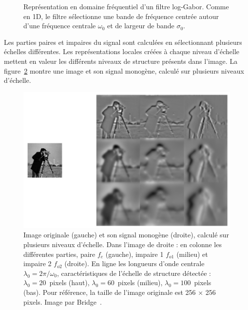 \bigskip

\begin{figure}
    \centering

    \caption[Filtre log-Gabor en 2D]{Représentation en domaine fréquentiel d'un filtre log-Gabor. Comme en 1D, le filtre sélectionne une bande de fréquence centrée autour d'une fréquence centrale $\omega_0$ et de largeur de bande $\sigma_0$.}
    \label{fig:2D-log-gabor}
\end{figure}

Les parties paires et impaires du signal sont calculées en sélectionnant plusieurs échelles différentes. Les représentations locales créées à chaque niveau d'échelle mettent en valeur les différents niveaux de structure présents dans l'image. La figure~\ref{fig:cameraman-monogenic} montre une image et son signal monogène, calculé sur plusieurs niveaux d'échelle.

\begin{figure}
    \centering
    \includegraphics[width=.75\textwidth]{resources/images/cameraman_monogenic}
    \caption[Signal monogène calculé pour plusieurs niveaux d'échelle]{Image originale (gauche) et son signal monogène (droite), calculé sur plusieurs niveaux d'échelle. Dans l'image de droite : en colonne les différentes parties, paire $f_e$ (gauche), impaire 1 $f_{o1}$ (milieu) et impaire 2 $f_{o2}$ (droite). En ligne les longueurs d'onde centrale $\lambda_0 = 2\pi/\omega_0$, caractéristiques de l'échelle de structure détectée : $\lambda_0 = 20$~pixels (haut), $\lambda_0 = 60$~pixels (milieu), $\lambda_0 = 100$~pixels (bas). Pour référence, la taille de l'image originale est 256 $\times$ 256 pixels. Image par Bridge~\cite{bridge_introduction_2018}.}
    \label{fig:cameraman-monogenic}
\end{figure}

